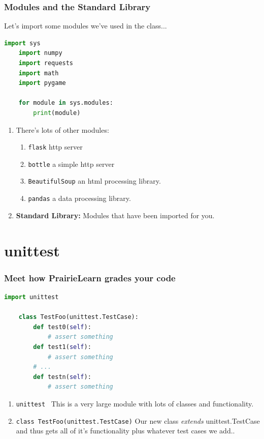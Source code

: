 \documentclass{beamer}
\begin{document}
%
%
\begin{frame}[fragile]
    \frametitle{Modules and the Standard Library}
    Let's import some modules we've used in the class...
    \begin{lstlisting}[language=Python, autogobble]
    import sys
    import numpy
    import requests
    import math
    import pygame

    for module in sys.modules:
        print(module)
    \end{lstlisting}
    \pause
    \vfill
    \begin{enumerate}
        \item There's lots of other modules:
        \begin{enumerate}[A]
            \item \lstinline|flask| \textrightarrow http server
            \item \lstinline|bottle| \textrightarrow a simple http server
            \item \lstinline|BeautifulSoup| \textrightarrow an html processing library.
            \item \lstinline|pandas| \textrightarrow a data processing library.
        \end{enumerate}
        \item \textbf{Standard Library: } Modules that have been imported for you.
    \end{enumerate}
\end{frame}

\section{unittest}

%
%
\begin{frame}[fragile]
    \frametitle{Meet how PrairieLearn grades your code}
    \begin{lstlisting}[language=Python, autogobble]
    import unittest 

    class TestFoo(unittest.TestCase):
        def test0(self):
            # assert something 
        def test1(self):
            # assert something 
        # ...
        def testn(self):
            # assert something 
    \end{lstlisting}
    \vfill
    \begin{enumerate}
        \pause
        \item \lstinline|unittest| \textrightarrow \ This is a very large module with lots of classes and functionality.
        \pause
        \item \lstinline|class TestFoo(unittest.TestCase)| \textrightarrow Our new class \textit{extends} unittest.TestCase and thus gets all of it's functionality plus whatever test cases we add..
    \end{enumerate}
\end{frame}
\end{document}

